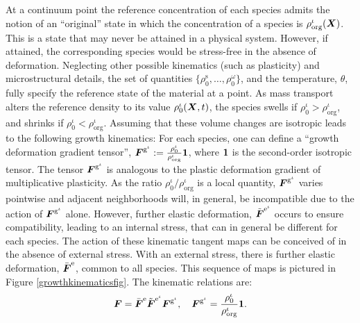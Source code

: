 At a continuum point the reference concentration of each species
admits the notion of an ``original'' state in which the
concentration of a species is $\rho_\mathrm{org}^\iota(\mbox{\boldmath$ X$})$. This
is a state that may never be attained in a physical system.
However, if attained, the corresponding species would be
stress-free in the absence of deformation. Neglecting other
possible kinematics (such as plasticity) and microstructural
details, the set of quantities
$\{\rho_0^\mathrm{s},\dots,\rho_0^\omega\}$, and the temperature,
$\theta$, fully specify the reference state of the material at a
point. As mass transport alters the reference density to its value
$\rho_0^\iota(\mbox{\boldmath$ X$},t)$, the species swells if $\rho_0^\iota >
\rho_\mathrm{org}^\iota$, and shrinks if $\rho_0^\iota <
\rho_\mathrm{org}^\iota$. Assuming that these volume changes are
isotropic leads to the following growth kinematics: For each
species, one can define a ``growth deformation gradient tensor'',
$\mbox{\boldmath$ F$}^{\mathrm{g}^\iota} :=
\frac{\rho_0^\iota}{\rho_\mathrm{org}^\iota}{\bf 1}$, where ${\bf
1}$ is the second-order isotropic tensor. The tensor
$\mbox{\boldmath$ F$}^{\mathrm{g}^\iota}$ is analogous to the plastic deformation
gradient of multiplicative plasticity. As the ratio
$\rho_0^\iota/\rho_\mathrm{org}^\iota$ is a local quantity,
$\mbox{\boldmath$ F$}^{\mathrm{g}^\iota}$ varies pointwise and adjacent
neighborhoods will, in general, be incompatible due to the action
of $\mbox{\boldmath$ F$}^{\mathrm{g}^\iota}$ alone. However, further elastic
deformation, $\tilde{\mbox{\boldmath$ F$}}^{\mathrm{e}^\iota}$ occurs to ensure
compatibility, leading to an internal stress, that can in general
be different for each species. The action of these kinematic
tangent maps can be conceived of in the absence of external
stress. With an external stress, there is further elastic
deformation, $\bar{\mbox{\boldmath$ F$}}^\mathrm{e}$, common to all species. This
sequence of maps is pictured in Figure \ref{growthkinematicsfig}.
The kinematic relations are:
\begin{equation}
\mbox{\boldmath$ F$} =
\bar{\mbox{\boldmath$ F$}}^\mathrm{e}\tilde{\mbox{\boldmath$ F$}}^{\mathrm{e}^\iota}\mbox{\boldmath$ F$}^{\mathrm{g}^\iota},\quad
\mbox{\boldmath$ F$}^{\mathrm{g}^\iota} =
\frac{\rho_0^\iota}{\rho_\mathrm{org}^\iota}{\bf 1}.
\label{growthkinematicseq}
\end{equation}

